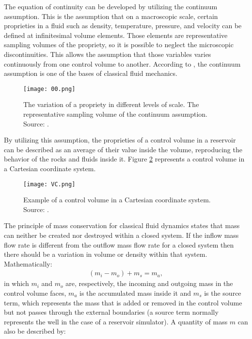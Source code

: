 The equation of continuity can be developed by utilizing the continuum assumption. This is the assumption that on a macroscopic scale, certain proprieties in a fluid such as density, temperature, pressure, and velocity can be defined at infinitesimal volume elements. Those elements are representative sampling volumes of the propriety, so it is possible to neglect the microscopic discontinuities. This allows the assumption that those variables varies continuously from one control volume to another. According to \cite{Fox2008}, the continuum assumption is one of the bases of classical fluid mechanics.
\begin{figure}[H]
	\centering
	\texttt{[image: 00.png]}\\
	\caption{The variation of a propriety in different levels of scale. The representative sampling volume of the continuum assumption. Source: \cite{Kandlikar2014}.}
	\label{fig:00}
\end{figure}
\noindent
By utilizing this assumption, the proprieties of a control volume in a reservoir can be described as an average of their value inside the volume, reproducing the behavior of the rocks and fluids inside it. Figure \ref{fig:1} represents a control volume in a Cartesian coordinate system.
	\begin{figure}[H]
	\centering
	\texttt{[image: VC.png]}\\
	\caption{Example of a control volume in a Cartesian coordinate system. Source: \cite{Ertekin2001}.}
	\label{fig:1}
	\end{figure}
The principle of mass conservation for classical fluid dynamics states that mass can neither be created nor destroyed within a closed system. If the inflow mass flow rate is different from the outflow mass flow rate for a closed system then there should be a variation in volume or density within that system. Mathematically:
	\begin{align}
	\label{eq:1}
	(m_i-m_o)+m_s=m_a ,
	\end{align}
in which $m_i$ and $m_o$ are, respectively, the incoming and outgoing mass in the control volume faces, $m_a$ is the accumulated mass inside it and $m_s$ is the source term, which represents the mass that is added or removed in the control volume but not passes through the external boundaries (a source term normally represents the well in the case of a reservoir simulator). A quantity of mass $m$ can also be described by:
